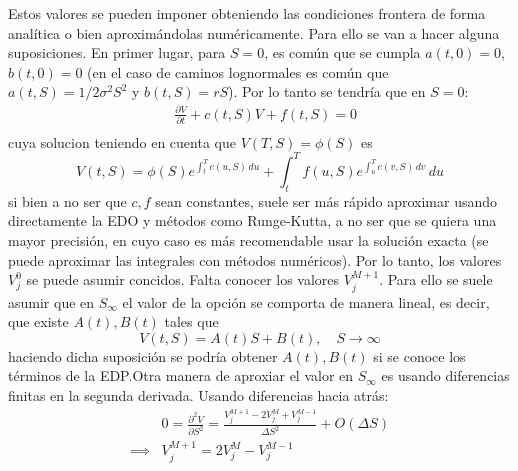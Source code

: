 Estos valores se pueden imponer obteniendo las condiciones frontera de forma analítica o bien aproximándolas numéricamente. Para ello se van a hacer alguna suposiciones. En primer lugar, para $S=0$, es común que se cumpla $a(t, 0)=0$, $b(t, 0)=0$ (en el caso de caminos lognormales es común que $a(t, S)=1/2\sigma^2S^2$ y $b(t,S)=rS$). Por lo tanto se tendría que en $S=0$:
\begin{align*}
    &\frac{\partial V}{\partial t} + c(t, S) V + f(t, S) = 0 \\
\end{align*}
cuya solucion teniendo en cuenta que $V(T,S)=\phi(S)$ es
\begin{equation*}
    V(t, S) = \phi(S) e^{\int_t^T c(u, S)\,du} + \int_t^T f(u, S) e^{\int_u^T c(v, S)\,dv}\,du
\end{equation*}
si bien a no ser que $c, f$ sean constantes, suele ser más rápido aproximar usando directamente la EDO y métodos como Runge-Kutta, a no ser que se quiera una mayor precisión, en cuyo caso es más recomendable usar la solución exacta (se puede aproximar las integrales con métodos numéricos). Por lo tanto, los valores $V_j^0$ se puede asumir concidos. Falta conocer los valores $V_j^{M+1}$. Para ello se suele asumir que en $S_\infty$ el valor de la opción se comporta de manera lineal, es decir, que existe $A(t), B(t)$ tales que
\begin{equation*}
    V(t, S) = A(t) S + B(t), \quad S \to \infty
\end{equation*}
haciendo dicha suposición se podría obtener $A(t), B(t)$ si se conoce los términos de la EDP.\@ Otra manera de aproxiar el valor en $S_\infty$ es usando diferencias finitas en la segunda derivada. Usando diferencias hacia atrás:
\begin{align*}
    &0 = \frac{\partial^2 V}{\partial S^2} = \frac{V_j^{M+1} - 2V_j^{M} + V_j^{M-1}}{\Delta S^2} + O(\Delta S) \\
    \implies &V_j^{M+1} = 2V_j^{M} - V_j^{M-1}
\end{align*}


